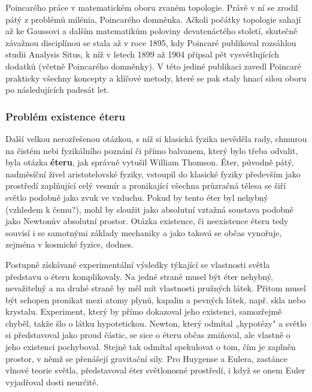 \begin{tcnote}
        Poincarého práce v matematickém oboru zvaném topologie. Právě v ní se zrodil pátý z problémů
        milénia, Poincarého domněnka. Ačkoli počátky topologie sahají až ke Gaussovi a dalším
        matematikům poloviny devatenáctého století, skutečně závažnou disciplínou se stala až v roce
        1895, kdy Poincaré publikoval rozsáhlou studii Analysis Situs, k níž v letech 1899 až 1904
        připsal pět vysvětlujících dodatků (včetně Poincarého domněnky). V této jediné publikaci
        zavedl Poincaré prakticky všechny koncepty a klíčové metody, které se pak staly hnací silou
        oboru po následujících padesát let.
      \end{tcnote}

      \subsubsection{Problém existence éteru}\label{fyz:IchapIIsecIVssecIsssecIV}
        Další velkou nerozřešenou otázkou, s níž si klasická fyzika nevěděla rady, chmurou na čistém
        nebi fyzikálního poznání či přímo balvanem, který bylo třeba odvalit, byla otázka
        \textbf{éteru}, jak správně vytušil William Thomson. Éter, původně pátý, nadměsíční živel
        aristotelovské fyziky, vstoupil do klasické fyziky především jako prostředí zaplňující celý
        vesmír a pronikající všechna průzračná tělesa se šiří světlo podobně jako zvuk ve vzduchu.
        Pokud by tento éter byl nehybný (vzhledem k čemu?), mohl by sloužit jako absolutní vztažná
        soustava podobně jako Newtonův absolutní prostor. Otázka existence, či neexistence éteru
        tedy souvisí i se samotnými základy mechaniky a jako taková se občas vynořuje, zejména v
        kosmické fyzice, dodnes.

        Postupně získávané experimentální výsledky týkající se vlastnosti světla představu o éteru
        komplikovaly. Na jedné straně musel být éter nehybný, nevažitelný a na druhé straně by měl
        mít vlastnosti pružných látek. Přitom musel být schopen pronikat mezi atomy plynů, kapalin a
        pevných látek, např. skla nebo krystalu. Experiment, který by přímo dokazoval jeho
        existenci, samozřejmě chyběl, takže šlo o látku hypotetickou. Newton, který odmítal
        „hypotézy" a světlo si představoval jako proud částic, se sice o éteru občas zmiňoval, ale
        vlastně o jeho existenci pochyboval. Stejně tak odmítal spekulovat o tom, čím je zaplněn
        prostor, v němž se přenášejí gravitační sily. Pro Huygense a Eulera, zastánce vlnové teorie
        světla, představoval éter světlonosné prostředí, i když se onem Euler vyjadřoval dosti
        neurčitě. 


